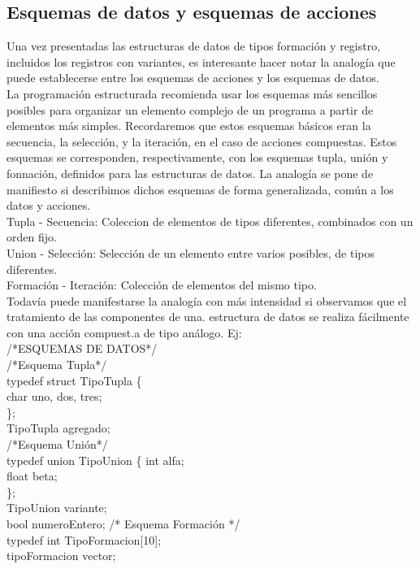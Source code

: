 \documentclass[11pt,a4paper]{article}
\begin{document}
  \subsection{Esquemas de datos y esquemas de acciones}
  Una vez presentadas las estructuras de datos de tipos formación y registro, incluidos los registros con variantes, es interesante hacer notar la analogía que
  puede establecerse entre los esquemas de acciones y los esquemas de datos.\\
  La programación estructurada recomienda usar los esquemas más sencillos posibles para organizar un elemento complejo de un programa a partir de elementos más simples. Recordaremos que estos esquemas básicos eran la secuencia, la selección, y la iteración, en el caso de acciones compuestas.
  Estos esquemas se corresponden, respectivamente, con los esquemas tupla, unión y fonnación, definidos para las estructuras de datos. La analogía se pone de manifiesto si describimos dichos esquemas de forma generalizada, común a los datos y acciones.\\
  Tupla - Secuencia: Coleccion de elementos de tipos diferentes, combinados con un orden fijo.\\
  Union - Selección: Selección de un elemento entre varios posibles, de tipos diferentes.\\
  Formación - Iteración: Colección de elementos del mismo tipo.\\
  Todavía puede manifestarse la analogía con más intensidad si observamos que
  	el tratamiento de las componentes de una. estructura de datos se realiza fácilmente
  	con una acción compuest.a de tipo análogo. Ej:\\
  	/*ESQUEMAS DE DATOS*/\\
  	/*Esquema Tupla*/\\
  	typedef struct TipoTupla \{\\
  	char uno, dos, tres;\\
  	\};\\
  	TipoTupla agregado;\\
  	/*Esquema Unión*/\\
  	typedef union TipoUnion \{
  	int alfa;\\
  	float beta;\\
  	\};\\
  	TipoUnion variante;\\
  	bool numeroEntero;
  	/* Esquema Formación */\\
  	typedef int TipoFormacion[10];\\
  	tipoFormacion vector;\\
\end{document}
